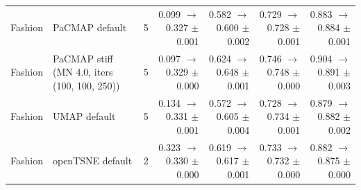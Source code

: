 \begin{tabular}{llrrrrr}
Fashion & PaCMAP default & 5 & 0.099 $\to$ 0.327 $\pm$ 0.001 & 0.582 $\to$ 0.600 $\pm$ 0.002 & 0.729 $\to$ 0.728 $\pm$ 0.001 & 0.883 $\to$ 0.884 $\pm$ 0.001 \\
Fashion & PaCMAP stiff (MN 4.0, iters (100, 100, 250)) & 5 & 0.097 $\to$ 0.329 $\pm$ 0.000 & 0.624 $\to$ 0.648 $\pm$ 0.001 & 0.746 $\to$ 0.748 $\pm$ 0.000 & 0.904 $\to$ 0.891 $\pm$ 0.003 \\
Fashion & UMAP default & 5 & 0.134 $\to$ 0.331 $\pm$ 0.001 & 0.572 $\to$ 0.605 $\pm$ 0.004 & 0.728 $\to$ 0.734 $\pm$ 0.001 & 0.879 $\to$ 0.882 $\pm$ 0.002 \\
Fashion & openTSNE default & 2 & 0.323 $\to$ 0.330 $\pm$ 0.000 & 0.619 $\to$ 0.617 $\pm$ 0.001 & 0.733 $\to$ 0.732 $\pm$ 0.000 & 0.882 $\to$ 0.875 $\pm$ 0.000 \\
\bottomrule
\end{tabular}
